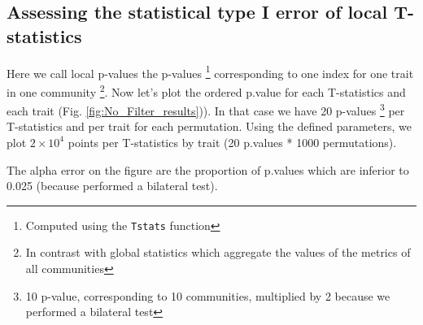\documentclass[12pt]{article}\usepackage[]{graphicx}\usepackage[]{color}
\begin{document}
 \subsection {Assessing the statistical type I error of local T-statistics}
 
Here we call local p-values the p-values \footnote{Computed using the \texttt{Tstats} function} corresponding to one index for one trait in one community \footnote{In contrast with global statistics which aggregate the values of the metrics of all communities}. Now let's plot the ordered p.value for each T-statistics and each trait (Fig. \ref{fig:No_Filter_results})). In that case we have 20 p-values \footnote{10 p-value, corresponding to 10 communities, multiplied by 2 because we performed a bilateral test} per T-statistics and per trait for each permutation. Using the defined parameters, we plot \ensuremath{2\times 10^{4}} points per T-statistics by trait (20 p.values * 1000 permutations). 

The alpha error on the figure are the proportion of p.values which are inferior to 0.025 (because performed a bilateral test).
\end{document}
